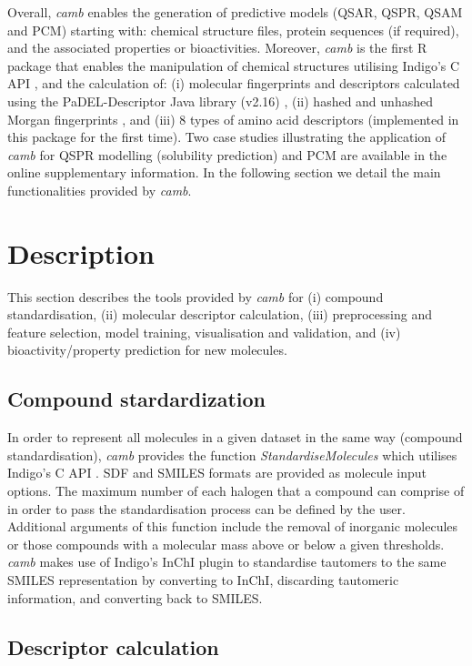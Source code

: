 \documentclass{bioinfo}
\begin{document}
Overall, {\it camb} enables the generation of predictive  models (QSAR, QSPR, QSAM and PCM)
starting with: chemical structure files, protein sequences (if required), and the associated properties or bioactivities.
Moreover, {\it camb} is the first R package that enables the manipulation of chemical structures utilising Indigo's C API \citep{Indigo},
and the calculation of:
(i) molecular fingerprints and descriptors calculated using the PaDEL-Descriptor Java library (v2.16) \citep{padel},
(ii) hashed and unhashed Morgan fingerprints \citep{extended_fp},
and (iii) 8 types of amino acid descriptors (implemented in this package for the first time). 
Two case studies illustrating the application of {\it camb} for
QSPR modelling (solubility prediction) and PCM are available in the online supplementary information.
In the following section we detail the main functionalities provided by {\it camb}. 

\section{Description}
This section describes the tools provided by {\it camb} 
for (i) compound standardisation, (ii) molecular descriptor calculation, 
(iii) preprocessing and feature selection, model training, visualisation and validation, and (iv) bioactivity/property prediction for new molecules.	

\subsection{Compound stardardization}

In order to represent all molecules in a given dataset in the same 
way (compound standardisation),
{\it camb}  provides the function {\it StandardiseMolecules} which utilises Indigo's C API \citep{Indigo}.
SDF and SMILES formats are provided as molecule input options.
The maximum number of each halogen that a compound can comprise of in order to pass the standardisation process can be defined by the user.
Additional arguments of this function include the removal of inorganic molecules
or those compounds with a molecular mass above or below a given thresholds.
{\it camb} makes use of Indigo's InChI \citep{inchi} plugin to standardise tautomers to the same SMILES representation
by converting to InChI, discarding tautomeric information, and converting back to SMILES.

\subsection{Descriptor calculation} 
\end{document}
